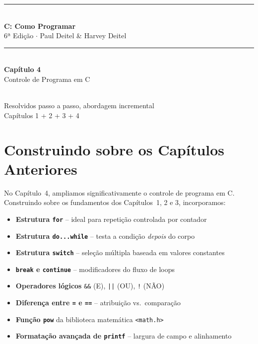 \documentclass[12pt,a4paper]{article}
\begin{document}
\begin{titlepage}
  \centering\vspace*{2cm}
  {\color{deitelblue}\rule{\linewidth}{2pt}}\\[0.4cm]
  {\huge\bfseries\color{deitelblue}C: Como Programar}\\[0.2cm]
  {\large\color{deitelblue}6ª Edição $\cdot$ Paul Deitel \& Harvey Deitel}\\[0.2cm]
  {\color{deitelblue}\rule{\linewidth}{2pt}}\\[1cm]
  {\LARGE\bfseries Capítulo 4}\\[0.3cm]
  {\Large\color{deitelblue!80}Controle de Programa em C}\\[0.8cm]
  \begin{tcolorbox}[colback=deitellightblue,colframe=deitelblue,width=0.85\linewidth]
    \\[0.2cm]
    {\normalsize Resolvidos passo a passo, abordagem incremental\\
    Capítulos 1 + 2 + 3 + 4}
  \end{tcolorbox}
\end{titlepage}

\section*{Construindo sobre os Capítulos Anteriores}

No Capítulo~4, ampliamos significativamente o controle de programa em C. Construindo sobre os fundamentos
dos Capítulos~1, 2 e 3, incorporamos:

\begin{itemize}[noitemsep]
  \item \textbf{Estrutura \texttt{for}} -- ideal para repetição controlada por contador
  \item \textbf{Estrutura \texttt{do...while}} -- testa a condição \textit{depois} do corpo
  \item \textbf{Estrutura \texttt{switch}} -- seleção múltipla baseada em valores constantes
  \item \textbf{\texttt{break} e \texttt{continue}} -- modificadores do fluxo de loops
  \item \textbf{Operadores lógicos} \texttt{\&\&} (E), \texttt{||} (OU), \texttt{!} (NÃO)
  \item \textbf{Diferença entre \texttt{=} e \texttt{==}} -- atribuição vs.\ comparação
  \item \textbf{Função \texttt{pow}} da biblioteca matemática \texttt{<math.h>}
  \item \textbf{Formatação avançada de \texttt{printf}} -- largura de campo e alinhamento
\end{itemize}
\end{document}
